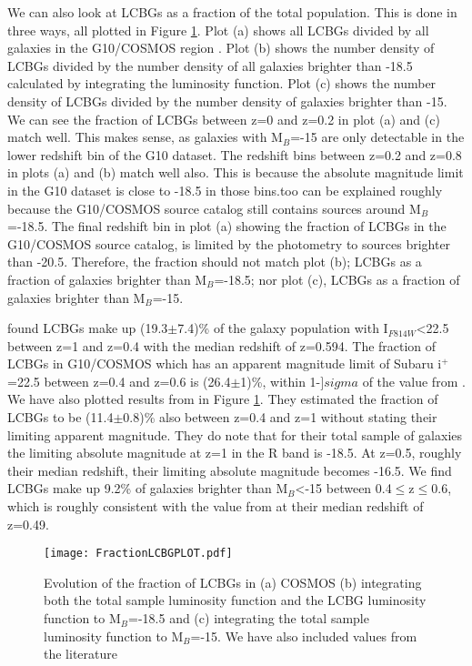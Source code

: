 \documentclass[manuscript]{aastex61}
\begin{document}
We can also look at LCBGs as a fraction of the total population. This is done in three ways, all plotted in Figure \ref{fig:Fracev}. Plot (a) shows all LCBGs divided by all galaxies in the G10/COSMOS region . Plot (b) shows the number density of LCBGs divided by the number density of all galaxies brighter than -18.5 calculated by integrating the luminosity function. Plot (c) shows the number density of LCBGs divided by the number density of galaxies brighter than -15. We can see the fraction of LCBGs between z=0 and z=0.2 in plot (a) and (c) match well. This makes sense, as galaxies with M$_{B}$=-15 are only detectable in the lower redshift bin of the G10 dataset. The redshift bins between z=0.2 and z=0.8 in plots (a) and (b) match well also. This is because the absolute magnitude limit in the G10 dataset is close to -18.5 in those bins.too can be explained roughly because the G10/COSMOS source catalog still contains sources around M$_{B}$=-18.5. The final redshift bin in plot (a) showing the fraction of LCBGs in the G10/COSMOS source catalog, is limited by the photometry to sources brighter than -20.5. Therefore, the fraction should not match plot (b); LCBGs as a fraction of galaxies brighter than M$_{B}$=-18.5; nor plot (c), LCBGs as a fraction of galaxies brighter than M$_{B}$=-15.

\citet{1997ApJ...489..559G} found LCBGs make up (19.3$\pm$7.4)\% of the galaxy population with I$_{F814W}$<22.5 between z=1 and z=0.4 with the median redshift of z=0.594. The fraction of LCBGs in G10/COSMOS which has an apparent magnitude limit of Subaru i$^{+}$=22.5 between z=0.4 and z=0.6 is (26.4$\pm$1)\%, within 1-$]sigma$ of the value from \citet{1997ApJ...489..559G}. We have also plotted results from \citet{2010ApJ...708.1076T} in Figure \ref{fig:Fracev}. They estimated the fraction of LCBGs to be (11.4$\pm$0.8)\% also between z=0.4 and z=1 without stating their limiting apparent magnitude. They do note that for their total sample of galaxies the limiting absolute magnitude at z=1 in the R band is -18.5. At z=0.5, roughly their median redshift, their limiting absolute magnitude becomes -16.5. We find LCBGs make up 9.2\% of galaxies brighter than M$_{B}$<-15 between 0.4$\leq$z$\leq$0.6, which is roughly consistent with the value from \citet{2010ApJ...708.1076T} at their median redshift of z=0.49.    


\begin{center}
\begin{figure}[!ht]
\texttt{[image: FractionLCBGPLOT.pdf]}
\caption{Evolution of the fraction of LCBGs in (a) COSMOS (b) integrating both the total sample luminosity function and the LCBG luminosity function to M$_{B}$=-18.5 and (c) integrating the total sample luminosity function to M$_{B}$=-15. We have also included values from the literature }
\label{fig:Fracev}
\end{figure}
\end{center}
\end{document}
